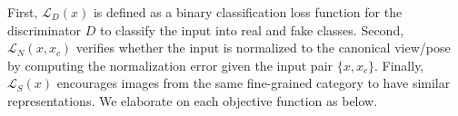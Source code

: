 \documentclass[runningheads]{llncs}
\begin{document}
First, $\mathcal{L}_D(x)$ is defined as a binary classification loss function for the discriminator $D$ to classify the input into real and fake classes. Second, $\mathcal{L}_N(x,x_c)$ verifies whether the input is normalized to the canonical view/pose by computing the normalization error given the input pair $\{x,x_c\}$. Finally, $\mathcal{L}_S(x)$ encourages images from the same fine-grained category to have similar representations. We elaborate on each objective function as below.
\end{document}
